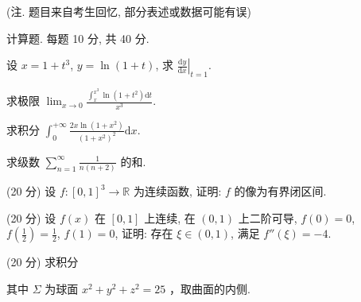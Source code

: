 (注. 题目来自考生回忆, 部分表述或数据可能有误)\par
\par{}
计算题. 每题 10 分, 共 40 分.\par
设 $x = 1 + t^3$, $y = \ln (1 + t)$, 求 $\left.\frac{\mathrm{d}y}{\mathrm{d}x}\right|_{t=1}$.\par
求极限 $\lim_{x\to 0}\frac{\int_x^{x^3}\ln(1 + t^2)\mathrm{d}t}{x^3}.$\par
求积分 $\int_0^{+\infty} \frac{2x \ln(1 + x^2)}{(1 + x^2)^2} \mathrm{d}x$.\par
求级数 $\sum_{n=1}^{\infty} \frac{1}{n(n+2)}$ 的和.\par
\par{}
(20 分) 设 $f: [0,1]^3 \to \mathbb{R}$ 为连续函数, 证明: $f$ 的像为有界闭区间.\par
\par{}
(20 分) 设 $f(x)$ 在 $[0,1]$ 上连续, 在 $(0,1)$ 上二阶可导, $f(0) = 0$, $f\left(\frac{1}{2}\right) = \frac{1}{2}$, $f(1) = 0$, 证明: 存在 $\xi \in (0,1)$, 满足 $f''(\xi) = -4$.\par
\par{}
\par{}
(20 分) 求积分\par
\nopagebreak[4]
其中  $\Sigma$  为球面  $x^{2} + y^{2} + z^{2} = 25$ ，取曲面的内侧.\par
\par{}
